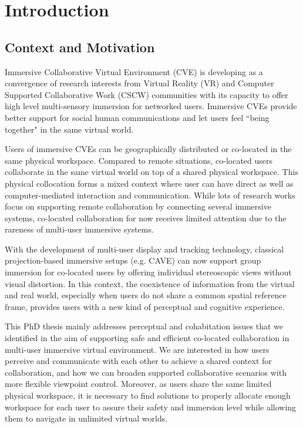 \chapter*{Introduction}
\mtcaddchapter[Introduction]

\section*{Context and Motivation}
Immersive Collaborative Virtual Environment (CVE) is developing as a convergence of research interests from Virtual Reality (VR) and Computer Supported Collaborative Work (CSCW) communities with its capacity to offer high level multi-sensory immersion for networked users. Immersive CVEs provide better support for social human communications and let users feel ``being together" in the same virtual world. 

Users of immersive CVEs can be geographically distributed or co-located in the same physical workspace. Compared to remote situations, co-located users collaborate in the same virtual world on top of a shared physical workspace. This physical collocation forms a mixed context where user can have direct as well as computer-mediated interaction and communication. While lots of research works focus on supporting remote collaboration by connecting several immersive systems, co-located collaboration for now receives limited attention due to the rareness of multi-user immersive systems.

With the development of multi-user display and tracking technology, classical projection-based immersive setups (e.g. CAVE) can now support group immersion for co-located users by offering individual stereoscopic views without visual distortion. In this context, the coexistence of information from the virtual and real world, especially when users do not share a common spatial reference frame, provides users with a new kind of perceptual and cognitive experience.

This PhD thesis mainly addresses perceptual and cohabitation issues that we identified in the aim of supporting safe and efficient co-located collaboration in multi-user immersive virtual environment. We are interested in how users perceive and communicate with each other to achieve a shared context for collaboration, and how we can broaden supported collaborative scenarios with more flexible viewpoint control. Moreover, as users share the same limited physical workspace, it is necessary to find solutions to properly allocate enough workspace for each user to assure their safety and immersion level while allowing them to navigate in unlimited virtual worlds.

